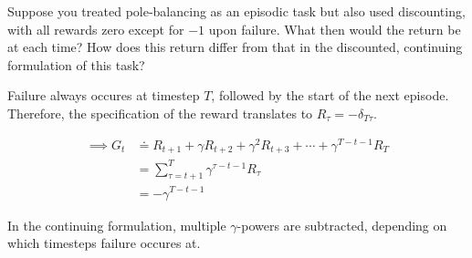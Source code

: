 
\begin{exercise}[Exercise 3.6]

Suppose you treated pole-balancing as an episodic task but also used discounting, with all rewards zero except for $-1$ upon failure.
What then would the return be at each time?
How does this return differ from that in the discounted, continuing formulation of this task?

\end{exercise}


\begin{solution}

Failure always occures at timestep $T$, followed by the start of the next episode.
Therefore, the specification  of the reward translates to $R_\tau = -\delta_{T \tau}$.

\begin{align*}
    \implies
    G_t
    & \doteq
    R_{t+1} + \gamma R_{t+2} + \gamma^2 R_{t+3} + \cdots + \gamma^{T-t-1} R_T \\
    & =
    \sum_{\tau = t+1}^T
        \gamma^{\tau - t - 1} R_\tau \\
    & =
    -\gamma^{T-t-1}
\end{align*}

In the continuing formulation, multiple $\gamma$-powers are subtracted, depending on which timesteps failure occures at.

\end{solution}

